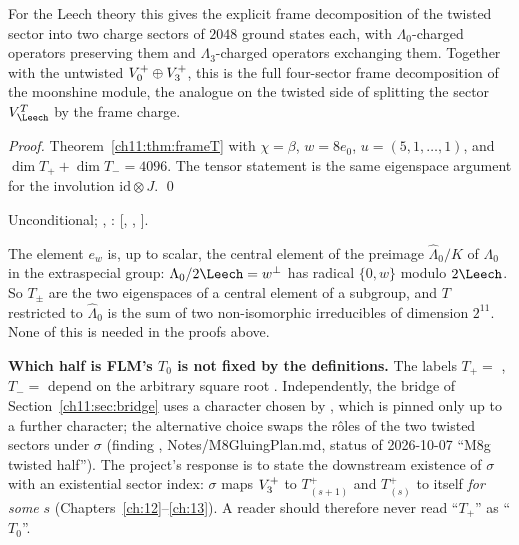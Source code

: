 \begin{physics}
For the Leech theory this gives the explicit frame decomposition of the twisted sector into two charge sectors of $2048$ ground states each, with $\Lambda_0$-charged operators preserving them and $\Lambda_3$-charged operators exchanging them. Together with the untwisted $V_0^{+}\oplus V_3^{+}$, this is the full four-sector frame decomposition of the moonshine module, the analogue on the twisted side of splitting the sector $V_\Leech^T$ by the frame charge.
\end{physics}
\emph{Proof.}  Theorem~\ref{ch11:thm:frameT} with $\chi=\beta$, $w=8e_0$, $u=(5,1,\ldots,1)$, and
$\dim T_++\dim T_-=4096$.  The tensor statement is the same eigenspace argument for the involution
$\mathrm{id}\otimes J$. \qed
\begin{status}Unconditional; ,
: [, , ].
\end{status}

\begin{remark}
The element $e_w$ is, up to scalar, the central element of the preimage $\hat\Lambda_0/K$ of
$\Lambda_0$ in the extraspecial group: $\Lambda_0/2\Leech=w^\perp$ has radical $\{0,w\}$ modulo
$2\Leech$.  So $T_\pm$ are the two eigenspaces of a central element of a subgroup, and $T$ restricted
to $\hat\Lambda_0$ is the sum of two non-isomorphic irreducibles of dimension $2^{11}$.  None of this
is needed in the proofs above.
\end{remark}

\begin{warning}
\textbf{Which half is FLM's $T_0$ is not fixed by the definitions.}  The labels $T_+=$
, $T_-=$  depend on the arbitrary square root .
Independently, the bridge of Section~\ref{ch11:sec:bridge} uses a character  chosen
by , which is pinned only up to a further character; the alternative choice
swaps the r\^oles of the two twisted sectors under $\sigma$ (finding ,
Notes/M8GluingPlan.md, status of 2026-10-07 ``M8g twisted half'').  The project's response is to
state the downstream existence of $\sigma$ with an existential sector index: $\sigma$ maps $V_3^{+}$
to $T_{(s+1)}^+$ and $T_{(s)}^+$ to itself \emph{for some} $s$ (Chapters~\ref{ch:12}--\ref{ch:13}).
A reader should therefore never read ``$T_+$'' as ``$T_0$''.
\end{warning}

